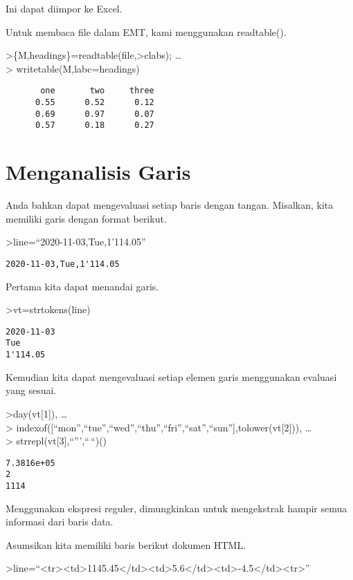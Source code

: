 \documentclass[
]{book}
\begin{document}
Ini dapat diimpor ke Excel.

Untuk membaca file dalam EMT, kami menggunakan readtable().

\textgreater\{M,headings\}=readtable(file,\textgreater clabs); \ldots{}\\
\textgreater{} writetable(M,labc=headings)

\begin{verbatim}
       one       two     three
      0.55      0.52      0.12
      0.69      0.97      0.07
      0.57      0.18      0.27
\end{verbatim}

\chapter{Menganalisis Garis}\label{menganalisis-garis}

Anda bahkan dapat mengevaluasi setiap baris dengan tangan. Misalkan, kita memiliki garis dengan format berikut.

\textgreater line=``2020-11-03,Tue,1'114.05''

\begin{verbatim}
2020-11-03,Tue,1'114.05
\end{verbatim}

Pertama kita dapat menandai garis.

\textgreater vt=strtokens(line)

\begin{verbatim}
2020-11-03
Tue
1'114.05
\end{verbatim}

Kemudian kita dapat mengevaluasi setiap elemen garis menggunakan evaluasi yang sesuai.

\textgreater day(vt{[}1{]}), \ldots{}\\
\textgreater{} indexof({[}``mon'',``tue'',``wed'',``thu'',``fri'',``sat'',``sun''{]},tolower(vt{[}2{]})), \ldots{}\\
\textgreater{} strrepl(vt{[}3{]},``''',``\,``)()

\begin{verbatim}
7.3816e+05
2
1114
\end{verbatim}

Menggunakan ekspresi reguler, dimungkinkan untuk mengekstrak hampir semua informasi dari baris data.

Asumsikan kita memiliki baris berikut dokumen HTML.

\textgreater line=``\textless tr\textgreater\textless td\textgreater1145.45\textless/td\textgreater\textless td\textgreater5.6\textless/td\textgreater\textless td\textgreater-4.5\textless/td\textgreater\textless tr\textgreater{}''
\end{document}
